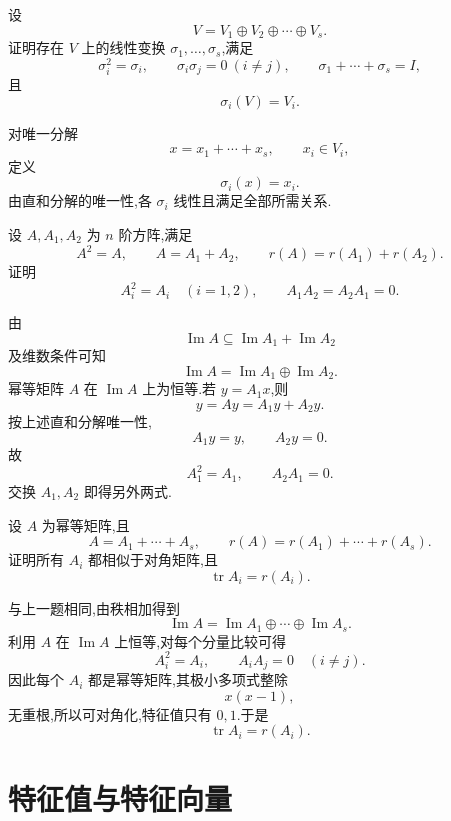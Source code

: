 \begin{example}
设
\[
V=V_1\oplus V_2\oplus\cdots\oplus V_s.
\]
证明存在 $V$ 上的线性变换 $\sigma_1,\ldots,\sigma_s$,满足
\[
\sigma_i^2=\sigma_i,\qquad
\sigma_i\sigma_j=0\ (i\neq j),\qquad
\sigma_1+\cdots+\sigma_s=I,
\]
且
\[
\sigma_i(V)=V_i.
\]
\end{example}
\exampleblank

\begin{solution}
对唯一分解
\[
x=x_1+\cdots+x_s,\qquad x_i\in V_i,
\]
定义
\[
\sigma_i(x)=x_i.
\]
由直和分解的唯一性,各 $\sigma_i$ 线性且满足全部所需关系.
\end{solution}


\begin{example}
设 $A,A_1,A_2$ 为 $n$ 阶方阵,满足
\[
A^2=A,\qquad
A=A_1+A_2,\qquad
r(A)=r(A_1)+r(A_2).
\]
证明
\[
A_i^2=A_i\quad(i=1,2),
\qquad
A_1A_2=A_2A_1=0.
\]
\end{example}
\exampleblank

\begin{solution}
由
\[
\operatorname{Im}A
\subseteq
\operatorname{Im}A_1+\operatorname{Im}A_2
\]
及维数条件可知
\[
\operatorname{Im}A
=
\operatorname{Im}A_1\oplus\operatorname{Im}A_2.
\]
幂等矩阵 $A$ 在 $\operatorname{Im}A$ 上为恒等.若 $y=A_1x$,则
\[
y=Ay=A_1y+A_2y.
\]
按上述直和分解唯一性,
\[
A_1y=y,\qquad A_2y=0.
\]
故
\[
A_1^2=A_1,\qquad A_2A_1=0.
\]
交换 $A_1,A_2$ 即得另外两式.
\end{solution}


\begin{example}
设 $A$ 为幂等矩阵,且
\[
A=A_1+\cdots+A_s,
\qquad
r(A)=r(A_1)+\cdots+r(A_s).
\]
证明所有 $A_i$ 都相似于对角矩阵,且
\[
\operatorname{tr}A_i=r(A_i).
\]
\end{example}
\exampleblank

\begin{solution}
与上一题相同,由秩相加得到
\[
\operatorname{Im}A
=
\operatorname{Im}A_1\oplus\cdots\oplus\operatorname{Im}A_s.
\]
利用 $A$ 在 $\operatorname{Im}A$ 上恒等,对每个分量比较可得
\[
A_i^2=A_i,\qquad A_iA_j=0\quad(i\neq j).
\]
因此每个 $A_i$ 都是幂等矩阵,其极小多项式整除
\[
x(x-1),
\]
无重根,所以可对角化,特征值只有 $0,1$.于是
\[
\boxed{\operatorname{tr}A_i=r(A_i)}.
\]
\end{solution}


\newpage

\section{特征值与特征向量}

